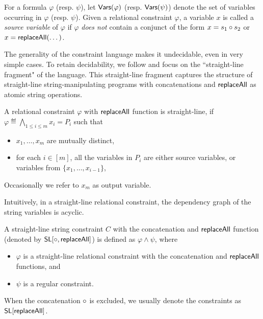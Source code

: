 For a formula $\varphi$ (resp. $\psi$), let $\mathsf{Vars}(\varphi)$ (resp. $\mathsf{Vars}(\psi)$) denote the set of variables occurring in $\varphi$ (resp. $\psi$). Given a relational constraint $\varphi$, a variable $x$ is called a \emph{source variable} of $\varphi$ if $\varphi$ \emph{does not} contain a conjunct of the form $x = s_1 \circ s_2$ or $x = \mathsf{replaceAll}(\dots)$.

 
The generality of the constraint language makes it undecidable,
even in very simple cases. To retain decidability, we follow \cite{LB16} and focus on the ``straight-line fragment" of the language. This straight-line fragment captures the structure of straight-line string-manipulating
programs with concatenations and $\mathsf{replaceAll}$ as atomic string operations.  

\begin{definition}
	A relational constraint $ \varphi$ with $\mathsf{replaceAll}$ function is straight-line, if $\varphi \eqdef \bigwedge \limits_{1 \le i \le m} x_i = P_i$ such that
	\begin{itemize}
		\item $x_1,\dots, x_m$ are mutually distinct,
		\item for each $i \in [m]$, all the variables in $P_i$ are either source variables, or variables from $\{x_1,\dots, x_{i-1}\}$,
	\end{itemize}
Occasionally we refer to $x_m$ as output variable. 
\end{definition}
Intuitively, in a straight-line relational constraint, the dependency graph of the string variables is acyclic.


\begin{definition}
	A straight-line string constraint $C$ with the concatenation and $\mathsf{replaceAll}$ function (denoted by $\mathsf{SL}[\circ,\mathsf{replaceAll}]$)  is defined as $ \varphi \wedge \psi$,  where 
	\begin{itemize}
		\item $\varphi$ is a straight-line relational constraint with the concatenation and $\mathsf{replaceAll}$ functions,  and
		\item $\psi$ is a regular constraint.
	\end{itemize}
When the concatenation $\circ$ is excluded, we usually denote the constraints as  $\mathsf{SL}[\mathsf{replaceAll}]$. 
\end{definition}

